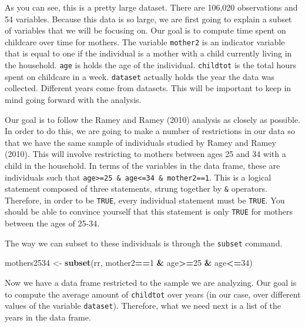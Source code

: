 \documentclass[
]{book}
\newenvironment{Shaded}{\begin{snugshade}}{\end{snugshade}}
\newcommand{\DecValTok}[1]{\textcolor[rgb]{0.00,0.00,0.81}{#1}}
\newcommand{\FunctionTok}[1]{\textcolor[rgb]{0.13,0.29,0.53}{\textbf{#1}}}
\newcommand{\NormalTok}[1]{#1}
\newcommand{\OtherTok}[1]{\textcolor[rgb]{0.56,0.35,0.01}{#1}}
\newcommand{\SpecialCharTok}[1]{\textcolor[rgb]{0.81,0.36,0.00}{\textbf{#1}}}
\begin{document}
As you can see, this is a pretty large dataset. There are 106,020 observations and 54 variables. Because this data is so large, we are first going to explain a subset of variables that we will be focusing on. Our goal is to compute time spent on childcare over time for mothers. The variable \texttt{mother2} is an indicator variable that is equal to one if the individual is a mother with a child currently living in the household. \texttt{age} is holds the age of the individual. \texttt{childtot} is the total hours spent on childcare in a week. \texttt{dataset} actually holds the year the data was collected. Different years come from datasets. This will be important to keep in mind going forward with the analysis.

Our goal is to follow the Ramey and Ramey (2010) analysis as closely as possible. In order to do this, we are going to make a number of restrictions in our data so that we have the same sample of individuals studied by Ramey and Ramey (2010). This will involve restricting to mothers between ages 25 and 34 with a child in the household. In terms of the variables in the data frame, these are individuals such that \texttt{age\textgreater{}=25\ \&\ age\textless{}=34\ \&\ mother2==1}. This is a logical statement composed of three statements, strung together by \texttt{\&} operators. Therefore, in order to be \texttt{TRUE}, every individual statement must be \texttt{TRUE}. You should be able to convince yourself that this statement is only \texttt{TRUE} for mothers between the ages of 25-34.

The way we can subset to these individuals is through the \texttt{subset} command.

\begin{Shaded}
\begin{Highlighting}[]
\NormalTok{mothers2534 }\OtherTok{\textless{}{-}} \FunctionTok{subset}\NormalTok{(rr, mother2}\SpecialCharTok{==}\DecValTok{1} \SpecialCharTok{\&}\NormalTok{ age}\SpecialCharTok{\textgreater{}=}\DecValTok{25} \SpecialCharTok{\&}\NormalTok{ age}\SpecialCharTok{\textless{}=}\DecValTok{34}\NormalTok{)}
\end{Highlighting}
\end{Shaded}

Now we have a data frame restricted to the sample we are analyzing. Our goal is to compute the average amount of \texttt{childtot} over years (in our case, over different values of the variable \texttt{dataset}). Therefore, what we need next is a list of the years in the data frame.
\end{document}
